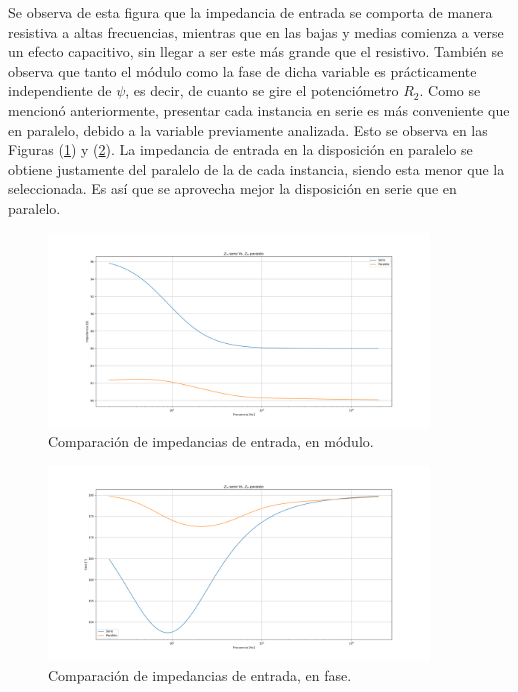 Se observa de esta figura que la impedancia de entrada se comporta de manera resistiva a altas frecuencias, mientras que en las bajas y medias comienza a verse un efecto capacitivo, sin llegar a ser este más grande que el resistivo. También se observa que tanto el módulo como la fase de dicha variable es prácticamente independiente de $\psi$, es decir, de cuanto se gire el potenciómetro $R_2$. Como se mencionó anteriormente, presentar cada instancia en serie es más conveniente que en paralelo, debido a la variable previamente analizada. Esto se observa en las Figuras (\ref{fig:zin_comp_mod}) y (\ref{fig:zin_comp_ph}). La impedancia de entrada en la disposición en paralelo se obtiene justamente del paralelo de la de cada instancia, siendo esta menor que la seleccionada. Es así que se aprovecha mejor la disposición en serie que en paralelo. 
\begin{figure}[H]
\centering
	\includegraphics[width=0.9\textwidth, trim = {0 0 0 1.35cm}, clip]{Imagenes/Z-Paralelo-Vs-Serie-Mod.png}
	\caption{Comparación de impedancias de entrada, en módulo.}
	\label{fig:zin_comp_mod}
\end{figure}
\begin{figure}[H]
\centering
		\includegraphics[width=0.9\textwidth, trim = {0 0 0 1.35cm}, clip]{Imagenes/Z-Paralelo-Vs-Serie-Ph.png}
	\caption{Comparación de impedancias de entrada, en fase.}
	\label{fig:zin_comp_ph}
\end{figure}

